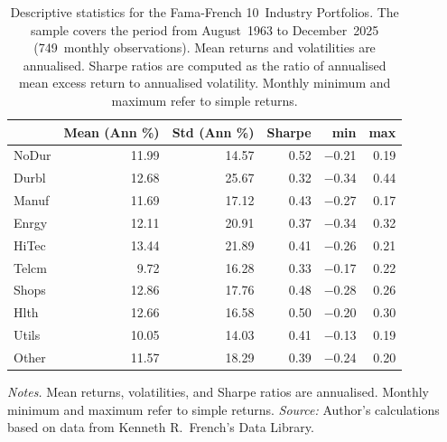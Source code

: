 \begin{table}[htbp]
  \centering
  \caption[Descriptive statistics for the Fama-French 10 Industry Portfolios]{Descriptive statistics for the Fama-French 10~Industry Portfolios. The sample covers the period from August~1963 to December~2025 (749~monthly observations). Mean returns and volatilities are annualised. Sharpe ratios are computed as the ratio of annualised mean excess return to annualised volatility. Monthly minimum and maximum refer to simple returns.}
  \label{tab:descriptive_stats}
  \small
\begin{tabular}{lrrrrr}
\toprule
 & Mean (Ann \%) & Std (Ann \%) & Sharpe & min & max \\
\midrule
NoDur & 11.99 & 14.57 & 0.52 & $-$0.21 & 0.19 \\
Durbl & 12.68 & 25.67 & 0.32 & $-$0.34 & 0.44 \\
Manuf & 11.69 & 17.12 & 0.43 & $-$0.27 & 0.17 \\
Enrgy & 12.11 & 20.91 & 0.37 & $-$0.34 & 0.32 \\
HiTec & 13.44 & 21.89 & 0.41 & $-$0.26 & 0.21 \\
Telcm & 9.72 & 16.28 & 0.33 & $-$0.17 & 0.22 \\
Shops & 12.86 & 17.76 & 0.48 & $-$0.28 & 0.26 \\
Hlth & 12.66 & 16.58 & 0.50 & $-$0.20 & 0.30 \\
Utils & 10.05 & 14.03 & 0.41 & $-$0.13 & 0.19 \\
Other & 11.57 & 18.29 & 0.39 & $-$0.24 & 0.20 \\
\bottomrule
\end{tabular}


  \smallskip
  \begin{minipage}{\textwidth}
    \footnotesize
    \textit{Notes.} Mean returns, volatilities, and Sharpe ratios are annualised. Monthly minimum and maximum refer to simple returns.
    \textit{Source:} Author's calculations based on data from Kenneth R.\ French's Data Library.
  \end{minipage}
\end{table}
